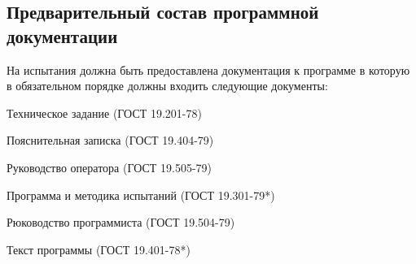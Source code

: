 \subsection{Предварительный состав программной документации}
На испытания должна быть предоставлена документация к программе в которую в обязательном порядке должны входить следующие документы:
\begin{my_enumerate}
\item Техническое задание  (ГОСТ 19.201-78)
\item Пояснительная записка  (ГОСТ 19.404-79)
\item Руководство оператора  (ГОСТ 19.505-79)
\item Программа и методика испытаний (ГОСТ 19.301-79*)
\item Рюководство программиста (ГОСТ 19.504-79)
\item Текст программы  (ГОСТ 19.401-78*)
\end{my_enumerate}

